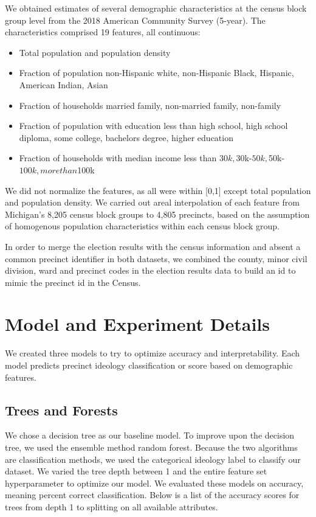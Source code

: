 \documentclass{article}
\begin{document}
\begin{itemize}
We obtained estimates of several demographic characteristics at the census block group level from the 2018 American Community Survey (5-year). The characteristics comprised 19 features, all continuous:

\begin{itemize}
    \item Total population and population density 
    \item Fraction of population {non-Hispanic white, non-Hispanic Black, Hispanic, American Indian, Asian}
    \item Fraction of households {married family, non-married family, non-family}
    \item Fraction of population with education {less than high school, high school diploma, some college, bachelors degree, higher education}
    \item Fraction of households with median income {less than $30k, $30k-$50k, $50k-$100k, more than $100k}
\end{itemize}
We did not normalize the features, as all were within [0,1] except total population and population density. We carried out areal interpolation of each feature from Michigan’s 8,205 census block groups to 4,805 precincts, based on the assumption of homogenous population characteristics within each census block group. 

In order to merge the election results with the census information and absent a common precinct identifier in both datasets, we combined the county, minor civil division, ward and precinct codes in the election results data to build an id to mimic the precinct id in the Census. 


\section{Model and Experiment Details}


We created three models to try to optimize  accuracy and interpretability. Each model 
predicts precinct ideology classification or score based on demographic features.

\subsection{Trees and Forests}

We chose a decision tree as our baseline model. To improve upon the decision tree, we used the ensemble method random forest. Because the two algorithms are classification methods, we used the  categorical ideology label to classify our dataset. We varied the tree depth between 1 and the entire feature set hyperparameter to optimize our model. We evaluated these models on accuracy, meaning percent correct classification. Below is a list of the accuracy scores for trees from depth 1 to splitting on all available attributes. 


\end{itemize}
\end{document}
